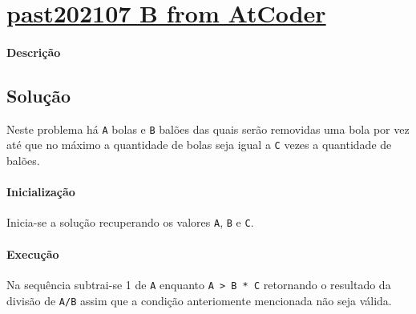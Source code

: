\documentclass[a4paper]{article}
\begin{document}
\newpage
\section{\href{https://atcoder.jp/contests/past202107-open/tasks/past202107_b?lang=en}{past202107 B from AtCoder}}
\paragraph{Descrição}

\subsection{Solução}Neste problema há \texttt{A} bolas e \texttt{B} balões das quais serão removidas uma bola por vez até que no máximo a quantidade de bolas seja igual a \texttt{C} vezes a quantidade de balões.

\paragraph{Inicialização}Inicia-se a solução recuperando os valores \texttt{A}, \texttt{B} e \texttt{C}.

\paragraph{Execução}Na sequência subtrai-se 1 de \texttt{A} enquanto \texttt{A > B * C} retornando o resultado da divisão de \texttt{A/B} assim que a condição anteriomente mencionada não seja válida.
\end{document}
